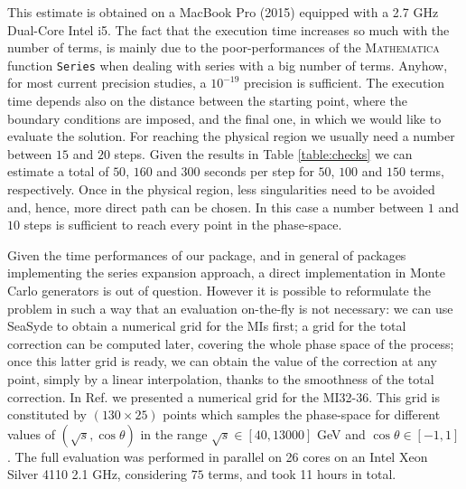 \documentclass[final,1p,times]{elsarticle}
\begin{document}
This estimate is obtained on a MacBook Pro (2015) equipped with a 2.7 GHz Dual-Core Intel i5. The fact that the execution time increases so much with the number of terms, is mainly due to the poor-performances of the \textsc{Mathematica} function \texttt{Series} when dealing with series with a big number of terms. Anyhow, for most current precision studies, a $10^{-19}$ precision is sufficient. The execution time depends also on the distance between the starting point, where the boundary conditions are imposed, and the final one, in which we would like to evaluate the solution. For reaching the physical region we usually need a number between $15$ and $20$ steps. Given the results in Table \ref{table:checks} we can estimate a total of $50$, $160$ and $300$ seconds per step for $50$, $100$ and $150$ terms, respectively.
Once in the physical region, less singularities need to be avoided and, hence, more direct path can be chosen. In this case a number between $1$ and $10$ steps is sufficient to reach every point in the phase-space.

Given the time performances of our package, and in general of packages implementing the series expansion approach, a direct implementation in Monte Carlo generators is out of question.
However it is possible to reformulate the problem in such a way that an evaluation on-the-fly is not necessary: we can use {\sc SeaSyde} to obtain a numerical grid for the MIs first; a grid for the total correction can be computed later, covering the whole phase space of the process;
once this latter grid is ready, we can obtain the value of the correction at any point, simply by a linear interpolation, thanks to the smoothness of the total correction.
In Ref. \cite{Armadillo:2022bgm} we presented a numerical grid for the MI32-36. This grid is constituted by $(130\times25)$ points which samples the phase-space for different values of $(\sqrt{s},\cos\theta)$ in the range $\sqrt{s}\in [40,13000 ] $ GeV and $\cos\theta\in[-1,1]$. The full evaluation was performed in parallel on 26 cores on an Intel Xeon Silver 4110 2.1 GHz, considering $75$ terms, and took 11 hours in total. 
\end{document}
